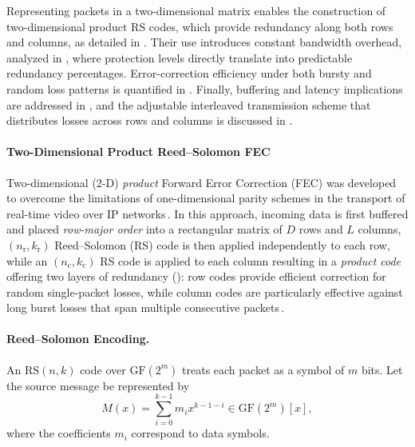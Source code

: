 \quad Representing packets in a two-dimensional matrix enables the construction of two-dimensional product RS codes, which provide redundancy along both rows and columns, as detailed in \textbf{}. Their use introduces constant bandwidth overhead, analyzed in \textbf{}, where protection levels directly translate into predictable redundancy percentages. Error-correction efficiency under both bursty and random loss patterns is quantified in \textbf{}. Finally, buffering and latency implications are addressed in \textbf{}, and the adjustable interleaved transmission scheme that distributes losses across rows and columns is discussed in \textbf{}.


\paragraph{Two-Dimensional Product Reed–Solomon FEC}
\label{sec:2d_fec}

Two-dimensional (2-D) \emph{product} Forward Error Correction (FEC) was developed to overcome the limitations of one-dimensional parity schemes in the transport of real-time video over IP networks\,\cite{prompeg,smpte2022}. In this approach, incoming data is first buffered and placed \emph{row-major order} into a rectangular matrix of \(D\) rows and \(L\) columns, \((n_{\mathrm r},k_{\mathrm r})\) Reed--Solomon (RS) code is then applied independently to each row, while an \((n_{\mathrm c},k_{\mathrm c})\) RS code is applied to each column resulting in a \emph{product code} offering two layers of redundancy (\textbf{}): row codes provide efficient correction for random single-packet losses, while column codes are particularly effective against long burst losses that span multiple consecutive packets\,\cite{rfc6865}.

\paragraph{Reed--Solomon Encoding.}
An \(\mathrm{RS}(n,k)\) code over \(\mathrm{GF}(2^{m})\) treats each packet as a symbol of \(m\) bits. Let the source message be represented by  
\begin{equation}
	M(x) = \sum_{i=0}^{k-1} m_i x^{k-1-i} \in \mathrm{GF}(2^{m})[x],
\end{equation}
where the coefficients \(m_i\) correspond to data symbols.  

